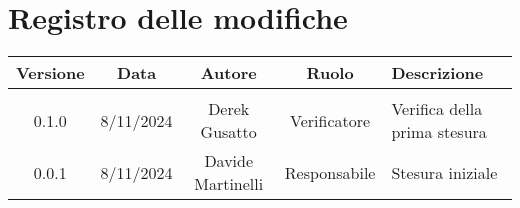 
\section*{Registro delle modifiche}
\begin{table}[H]
    \begin{tabular}{|c|c|c|c|p{4cm}|}
        \hline
         \textbf{Versione} &  \textbf{Data} &  \textbf{Autore} &  \textbf{Ruolo} & \textbf{Descrizione} \\
          \hline
          
          \hline
          &  &  &  &  \\
          \hline
          0.1.0& 8/11/2024& Derek Gusatto & Verificatore & Verifica della prima stesura \\
          \hline
          0.0.1 & 8/11/2024 & Davide Martinelli & Responsabile & Stesura iniziale\\
          \hline
    \end{tabular}
\end{table}
